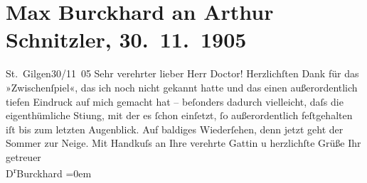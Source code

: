

         
         \renewcommand{\erwaehntePersonen}{Personen: Olga Schnitzler}
         \renewcommand{\erwaehnteOrte}{Orte: Berlin, Deutsches Theater Berlin, St. Gilgen, Wien}
         \renewcommand{\erwaehnteWerke}{Werke: Zwischenspiel. Komödie in drei Akten}
               \section[Max Burckhard an Arthur Schnitzler, 30. 11. 1905]{ Max Burckhard an Arthur Schnitzler, 30. 11. 1905}\nopagebreak{}\rehead{ }\begin{ledgroupsized}[t]{13cm}\normalsize\beginnumbering \toendnotes[C]{\smallbreak\pagebreak[2]} 
\toendnotes[C]{\smallbreak}\pstart
           \raggedleft{}{\pb}St. Gilgen30/11 05\pend
           \pstart{}Sehr verehrter lieber Herr Doctor!\pend\pstart
           Herzlichſten Dank für das »Zwischenſpiel«, das
               ich noch nicht gekannt hatte und das einen außerordentlich tiefen Eindruck auf mich
               gemacht hat – beſonders dadurch vielleicht, daſs die eigenthümliche Sti{\geminationm}ung, {\pb}mit
               der es ſchon einſetzt, ſo außerordentlich feſtgehalten iſt bis zum letzten
               Augenblick.\pend
           \pstart
           Auf baldiges Wiederſehen, denn jetzt geht der Sommer zur Neige.\pend
           \pstart
           Mit Handkuſs an Ihre verehrte Gattin u herzlichſte Grüße\pend
           \pstart
           Ihr getreuer{\\[\baselineskip]}\spacefill\mbox{D\textsuperscript{r}Burckhard}\pend
           \leftskip=0em{}\pstart

\end{ledgroupsized}
